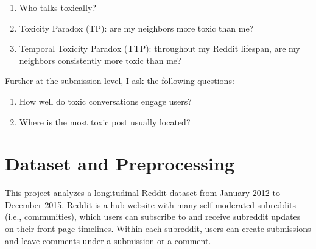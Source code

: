 \documentclass[10pt,twocolumn,letterpaper]{article}
\newcommand{\subscript}[2]{$#1 _ #2$}
\begin{document}
\begin{enumerate}
\itemsep0em 
    \item Who talks toxically?
    \item Toxicity Paradox (TP): are my neighbors more toxic than me?
    \item Temporal Toxicity Paradox (TTP): throughout my Reddit lifespan, are my neighbors consistently more toxic than me?
\end{enumerate}

Further at the submission level, I ask the following questions:

\begin{enumerate}
\itemsep0em 
    \item How well do toxic conversations engage users?
    \item Where is the most toxic post usually located?
\end{enumerate}



\section{Dataset and Preprocessing}

This project analyzes a longitudinal Reddit dataset from January 2012 to December 2015. Reddit is a hub website with many self-moderated subreddits (i.e., communities), which users can subscribe to and receive subreddit updates on their front page timelines. Within each subreddit, users can create submissions and leave comments under a submission or a comment. 
\end{document}
